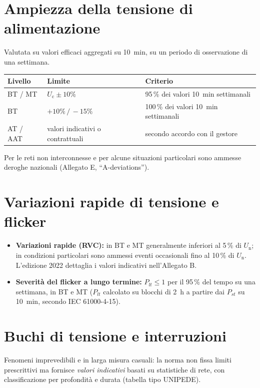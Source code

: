 \documentclass[11pt,a4paper]{article}
\newcommand{\Uc}{U_{\mathrm{c}}}
\newcommand{\Un}{U_{\mathrm{n}}}
\begin{document}
\section{Ampiezza della tensione di alimentazione}

Valutata su valori efficaci aggregati su \SI{10}{\minute}, su un periodo di osservazione
di una settimana.

\begin{table}[h]
\centering
\begin{tabular}{lll}
\toprule
\textbf{Livello} & \textbf{Limite} & \textbf{Criterio} \\
\midrule
BT / MT & $\Uc \pm 10\%$ & 95\,\% dei valori \SI{10}{\minute} settimanali \\
BT & $+10\%\,/\,-15\%$ & 100\,\% dei valori \SI{10}{\minute} settimanali \\
AT / AAT & valori indicativi o contrattuali & secondo accordo con il gestore \\
\bottomrule
\end{tabular}
\end{table}

\noindent
Per le reti non interconnesse e per alcune situazioni particolari sono ammesse
deroghe nazionali (Allegato E, ``A-deviations'').

\section{Variazioni rapide di tensione e flicker}

\begin{itemize}[itemsep=2pt]
  \item \textbf{Variazioni rapide (RVC):} in BT e MT generalmente inferiori al 5\,\% di $\Un$;
        in condizioni particolari sono ammessi eventi occasionali fino al 10\,\% di $\Un$.
        L'edizione 2022 dettaglia i valori indicativi nell'Allegato B.
  \item \textbf{Severità del flicker a lungo termine:} $P_{lt} \le 1$ per il 95\,\% del tempo
        su una settimana, in BT e MT ($P_{lt}$ calcolato su blocchi di \SI{2}{\hour}
        a partire dai $P_{st}$ su \SI{10}{\minute}, secondo IEC 61000-4-15).
\end{itemize}

\section{Buchi di tensione e interruzioni}

Fenomeni imprevedibili e in larga misura casuali: la norma non fissa limiti prescrittivi
ma fornisce \emph{valori indicativi} basati su statistiche di rete, con classificazione
per profondità e durata (tabella tipo UNIPEDE).
\end{document}
